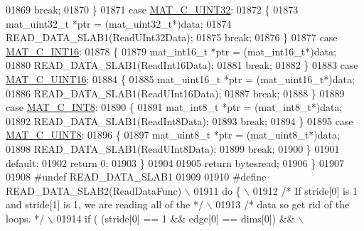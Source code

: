 \begin{DoxyCode}
{{{{{{{{{01869             \textcolor{keywordflow}{break};
01870         \}
01871         \textcolor{keywordflow}{case} \hyperlink{group___m_a_t_ggad4d60ae7b709fc81bfd744fb4c857c40a9a17a7edd45b19ef68197db81b27e816}{MAT\_C\_UINT32}:
01872         \{
01873             mat\_uint32\_t *ptr = (mat\_uint32\_t*)data;
01874             READ\_DATA\_SLAB1(ReadUInt32Data);
01875             \textcolor{keywordflow}{break};
01876         \}
01877         \textcolor{keywordflow}{case} \hyperlink{group___m_a_t_ggad4d60ae7b709fc81bfd744fb4c857c40a40370e9de516c5036a67a5865c071006}{MAT\_C\_INT16}:
01878         \{
01879             mat\_int16\_t *ptr = (mat\_int16\_t*)data;
01880             READ\_DATA\_SLAB1(ReadInt16Data);
01881             \textcolor{keywordflow}{break};
01882         \}
01883         \textcolor{keywordflow}{case} \hyperlink{group___m_a_t_ggad4d60ae7b709fc81bfd744fb4c857c40a8bede21dbf6c1edc0bbccc1481bccae7}{MAT\_C\_UINT16}:
01884         \{
01885             mat\_uint16\_t *ptr = (mat\_uint16\_t*)data;
01886             READ\_DATA\_SLAB1(ReadUInt16Data);
01887             \textcolor{keywordflow}{break};
01888         \}
01889         \textcolor{keywordflow}{case} \hyperlink{group___m_a_t_ggad4d60ae7b709fc81bfd744fb4c857c40a984ff310f9e906100fcff95f704f43c5}{MAT\_C\_INT8}:
01890         \{
01891             mat\_int8\_t *ptr = (mat\_int8\_t*)data;
01892             READ\_DATA\_SLAB1(ReadInt8Data);
01893             \textcolor{keywordflow}{break};
01894         \}
01895         \textcolor{keywordflow}{case} \hyperlink{group___m_a_t_ggad4d60ae7b709fc81bfd744fb4c857c40a81270f8093cb4808e992c1d29d84d4e3}{MAT\_C\_UINT8}:
01896         \{
01897             mat\_uint8\_t *ptr = (mat\_uint8\_t*)data;
01898             READ\_DATA\_SLAB1(ReadUInt8Data);
01899             \textcolor{keywordflow}{break};
01900         \}
01901         \textcolor{keywordflow}{default}:
01902             \textcolor{keywordflow}{return} 0;
01903     \}
01904 
01905     \textcolor{keywordflow}{return} bytesread;
01906 \}
01907 
01908 \textcolor{preprocessor}{#undef READ\_DATA\_SLAB1}
01909 
01910 \textcolor{preprocessor}{#define READ\_DATA\_SLAB2(ReadDataFunc) \(\backslash\)}
01911 \textcolor{preprocessor}{    do \{ \(\backslash\)}
01912 \textcolor{preprocessor}{        }\textcolor{comment}{/* If stride[0] is 1 and stride[1] is 1, we are reading all of the */}\textcolor{preprocessor}{ \(\backslash\)}
01913 \textcolor{preprocessor}{        }\textcolor{comment}{/* data so get rid of the loops. */}\textcolor{preprocessor}{ \(\backslash\)}
01914 \textcolor{preprocessor}{        if ( (stride[0] == 1 && edge[0] == dims[0]) && \(\backslash\)}
}}}}}}}}}
\end{DoxyCode}
